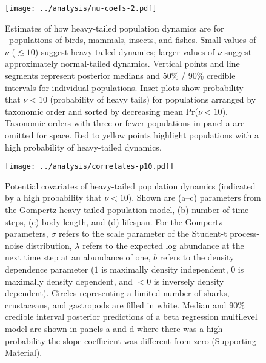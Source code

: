 \clearpage

\begin{figure}[htbp]
\begin{center}
\texttt{[image: ../analysis/nu-coefs-2.pdf]}
\caption{
Estimates of how heavy-tailed population dynamics are for \nuCoefPopN\
populations of birds, mammals, insects, and fishes. Small values of $\nu$
($\lesssim 10$) suggest heavy-tailed dynamics; larger values of $\nu$ suggest
approximately normal-tailed dynamics. Vertical points and line segments
represent posterior medians and 50\% / 90\% credible intervals for individual
populations. Inset plots show probability that $\nu < 10$ (probability of
heavy tails) for populations arranged by taxonomic order and sorted by
decreasing mean Pr($\nu < 10$). Taxonomic orders with three or fewer
populations in panel a are omitted for space. Red to yellow points highlight
populations with a high probability of heavy-tailed dynamics.
} \label{fig:nu-coefs} \end{center} \end{figure}

\clearpage

\begin{figure}[htbp]
\begin{center}
\texttt{[image: ../analysis/correlates-p10.pdf]}
\caption{
Potential covariates of heavy-tailed population dynamics (indicated by a high
probability that $\nu < 10$). Shown are (a--c) parameters from the Gompertz
heavy-tailed population model, (b) number of time steps, (c) body length, and
(d) lifespan. For the Gompertz parameters, $\sigma$ refers to the scale
parameter of the Student-t process-noise distribution, $\lambda$ refers to the
expected log abundance at the next time step at an abundance of one, $b$
refers to the density dependence parameter ($1$ is maximally density
independent, $0$ is maximally density dependent, and $<0$ is inversely density
dependent).
Circles representing a limited number of sharks, crustaceans, and gastropods
are filled in white. Median and 90\% credible interval posterior predictions of
a beta regression multilevel model are shown in panels a and d where there was
a high probability the slope coefficient was different from zero (Supporting
Material).
}
\label{fig:correlates}
\end{center}
\end{figure}

